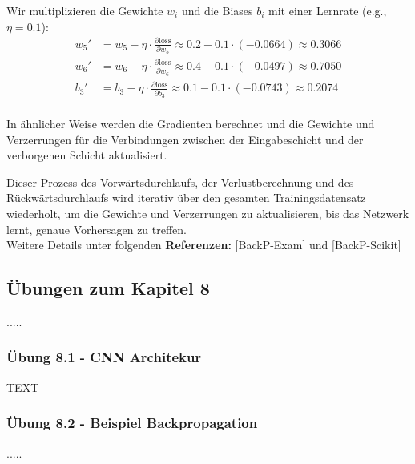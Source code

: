 \documentclass[12pt]{article}
\begin{document}
Wir multiplizieren die Gewichte $w_i$ und die Biases $b_i$ mit einer Lernrate (e.g., $\eta = 0.1$):\\

\[
\begin{aligned}
w_5' &= w_5 - \eta \cdot \frac{\partial \text{loss}}{\partial w_5} \approx 0.2 - 0.1 \cdot (-0.0664) \approx 0.3066 \\
w_6' &= w_6 - \eta \cdot \frac{\partial \text{loss}}{\partial w_6} \approx 0.4 - 0.1 \cdot (-0.0497) \approx 0.7050 \\
b_3' &= b_3 - \eta \cdot \frac{\partial \text{loss}}{\partial b_3} \approx 0.1 - 0.1 \cdot (-0.0743) \approx 0.2074 \\
\end{aligned}
\]

In ähnlicher Weise werden die Gradienten berechnet und die Gewichte und Verzerrungen für die Verbindungen zwischen der Eingabeschicht und der verborgenen Schicht aktualisiert.

Dieser Prozess des Vorwärtsdurchlaufs, der Verlustberechnung und des Rückwärtsdurchlaufs wird iterativ über den gesamten Trainingsdatensatz wiederholt, um die Gewichte und Verzerrungen zu aktualisieren, bis das Netzwerk lernt, genaue Vorhersagen zu treffen.\\[0.2cm]

Weitere Details unter folgenden \textbf{Referenzen:} [BackP-Exam] und [BackP-Scikit]  
\newpage

\subsection{Übungen zum Kapitel 8}

{\color{red}{*******************************************************************\\ 
ab hier bis Ende der Übungen sind die Folien der Vorlesung ML  zu nutzen und diese sind in Latex umzusetzen\\
********************************************************************\\}}  
.....\\
\subsubsection{Übung 8.1 - CNN Architekur}
TEXT\\
\subsubsection{Übung 8.2 - Beispiel Backpropagation}
.....\\
\end{document}
